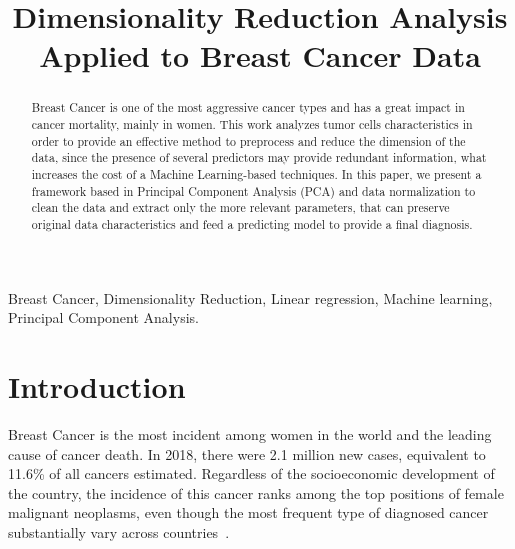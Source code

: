 \documentclass[conference]{IEEEtran}
\begin{document}
\title{Dimensionality Reduction Analysis Applied to Breast Cancer Data}

\author{
\and
{}
}

\maketitle

\begin{abstract}
Breast Cancer is one of the most aggressive cancer types and has a great impact in cancer mortality, mainly in women. This work analyzes tumor cells characteristics in order to provide an effective method to preprocess and reduce the dimension of the data, since the presence of several predictors may provide redundant information, what increases the cost of a Machine Learning-based techniques. In this paper, we present a framework based in Principal Component Analysis (PCA) and data normalization to clean the data and extract only the more relevant parameters, that can preserve original data characteristics and feed a predicting model to provide a final diagnosis.

\end{abstract}

\begin{IEEEkeywords}
Breast Cancer, Dimensionality Reduction, Linear regression, Machine learning, Principal Component Analysis.
\end{IEEEkeywords}

\section{Introduction}
Breast Cancer is the most incident among women in the world and the leading cause of cancer death. In 2018, there were 2.1 million new cases, equivalent to 11.6\% of all cancers estimated. Regardless of the socioeconomic development of the country, the incidence of this cancer ranks among the top positions of female malignant neoplasms, even though the most frequent type of diagnosed cancer substantially vary across countries~\cite{Bray2018}.
\end{document}
